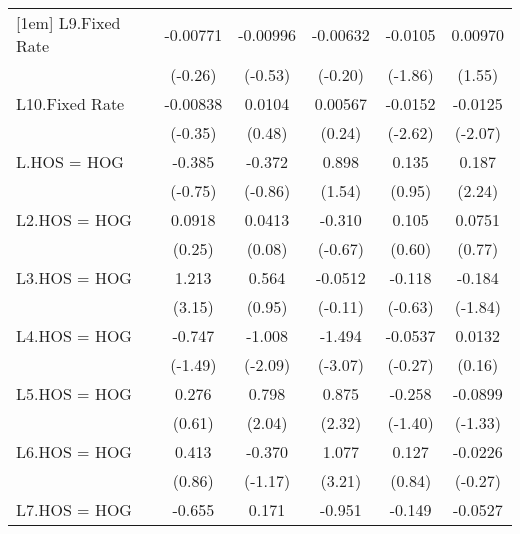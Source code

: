 {\begin{longtable}{l*{5}{c}}
[1em]
L9.Fixed Rate   & -0.00771         & -0.00996         & -0.00632         &  -0.0105         &  0.00970         \\
                &  (-0.26)         &  (-0.53)         &  (-0.20)         &  (-1.86)         &   (1.55)         \\
[1em]
L10.Fixed Rate  & -0.00838         &   0.0104         &  0.00567         &  -0.0152\sym{**} &  -0.0125\sym{*}  \\
                &  (-0.35)         &   (0.48)         &   (0.24)         &  (-2.62)         &  (-2.07)         \\
[1em]
L.HOS = HOG     &   -0.385         &   -0.372         &    0.898         &    0.135         &    0.187\sym{*}  \\
                &  (-0.75)         &  (-0.86)         &   (1.54)         &   (0.95)         &   (2.24)         \\
[1em]
L2.HOS = HOG    &   0.0918         &   0.0413         &   -0.310         &    0.105         &   0.0751         \\
                &   (0.25)         &   (0.08)         &  (-0.67)         &   (0.60)         &   (0.77)         \\
[1em]
L3.HOS = HOG    &    1.213\sym{**} &    0.564         &  -0.0512         &   -0.118         &   -0.184         \\
                &   (3.15)         &   (0.95)         &  (-0.11)         &  (-0.63)         &  (-1.84)         \\
[1em]
L4.HOS = HOG    &   -0.747         &   -1.008\sym{*}  &   -1.494\sym{**} &  -0.0537         &   0.0132         \\
                &  (-1.49)         &  (-2.09)         &  (-3.07)         &  (-0.27)         &   (0.16)         \\
[1em]
L5.HOS = HOG    &    0.276         &    0.798\sym{*}  &    0.875\sym{*}  &   -0.258         &  -0.0899         \\
                &   (0.61)         &   (2.04)         &   (2.32)         &  (-1.40)         &  (-1.33)         \\
[1em]
L6.HOS = HOG    &    0.413         &   -0.370         &    1.077\sym{**} &    0.127         &  -0.0226         \\
                &   (0.86)         &  (-1.17)         &   (3.21)         &   (0.84)         &  (-0.27)         \\
[1em]
L7.HOS = HOG    &   -0.655         &    0.171         &   -0.951\sym{*}  &   -0.149         &  -0.0527         \\

\end{longtable}}
